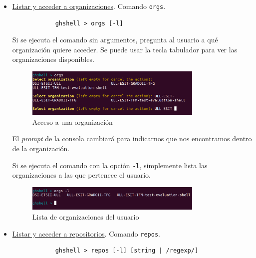 \begin{itemize}
		\item  \underline{Listar y acceder a organizaciones}. Comando \verb|orgs|.
		
		\begin{verbatim}
			ghshell > orgs [-l]
		\end{verbatim}
		
		Si se ejecuta el comando sin argumentos, pregunta al usuario a qué organización quiere acceder. Se puede usar la tecla tabulador para ver las organizaciones disponibles.
		
		\begin{figure}[H]
		\begin{center}
		\includegraphics[width=0.8\textwidth]{images/orgs1-1}
		\caption{Acceso a una organización}
		\label{fig:orgs1-1}
		\end{center}
		\end{figure}
		
		El {\it prompt} de la consola cambiará para indicarnos que nos encontramos dentro de la organización.
		\bigskip
		
		Si se ejecuta el comando con la opción \verb|-l|, simplemente lista las organizaciones a las que pertenece el usuario.
		
		\begin{figure}[H]
		\begin{center}
		\includegraphics[width=0.8\textwidth]{images/ghshell3}
		\caption{Lista de organizaciones del usuario}
		\label{fig:ghshell3}
		\end{center}
		\end{figure}

\newpage
		\item  \underline{Listar y acceder a repositorios}. Comando \verb|repos|.
		
		\begin{verbatim}
			ghshell > repos [-l] [string | /regexp/]
		\end{verbatim}
		

\end{itemize}

